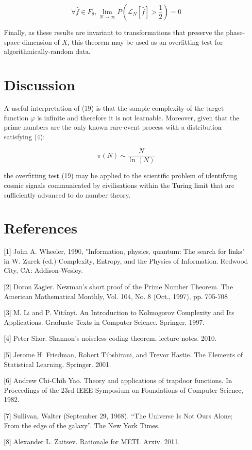 \documentclass{article}
\begin{document}
\begin{equation}
\forall \hat{f} \in F_{\theta}, \lim_{N \to \infty} P(\mathcal{L}_N[\hat{f}] > \frac{1}{2}) = 0
\end{equation}

Finally, as these results are invariant to transformations that preserve the 
phase-space dimension of $X$, this theorem may be used as an overfitting test 
for algorithmically-random data. 

\newpage

\section{Discussion}

A useful interpretation of (19) is that the sample-complexity of the target function $\varphi$ is infinite and therefore it is not learnable. Moreover, given that the prime numbers are the only known rare-event process with a distribution satisfying (4): 

\begin{equation}
\pi(N) \sim \frac{N}{\ln(N)}	
\end{equation}

the overfitting test (19) may be applied to the scientific problem of identifying cosmic signals communicated by civilisations within the Turing limit that are 
sufficiently advanced to do number theory. 

\section*{References}

\small

[1] John A. Wheeler, 1990, "Information, physics, quantum: The search for links" in W. Zurek (ed.) Complexity, Entropy, and the Physics of Information. Redwood City, CA: Addison-Wesley.

[2] Doron Zagier. Newman’s short proof of the Prime Number Theorem. The American Mathematical Monthly, Vol. 104, No. 8 (Oct., 1997), pp. 705-708

[3] M. Li and P. Vitányi. An Introduction to Kolmogorov Complexity and Its Applications. Graduate Texts in Computer Science. Springer. 1997.

[4] Peter Shor. Shannon’s noiseless coding theorem. lecture notes. 2010.

[5] Jerome H. Friedman, Robert Tibshirani, and Trevor Hastie. The Elements of Statistical Learning. Springer. 2001.

[6] Andrew Chi-Chih Yao. Theory and applications of trapdoor functions. In Proceedings of the 23rd IEEE Symposium on Foundations of Computer Science, 1982.

[7] Sullivan, Walter (September 29, 1968). “The Universe Is Not Ours Alone; From the edge of the galaxy”. The New York Times.

[8] Alexander L. Zaitsev. Rationale for METI. Arxiv. 2011.
\end{document}
